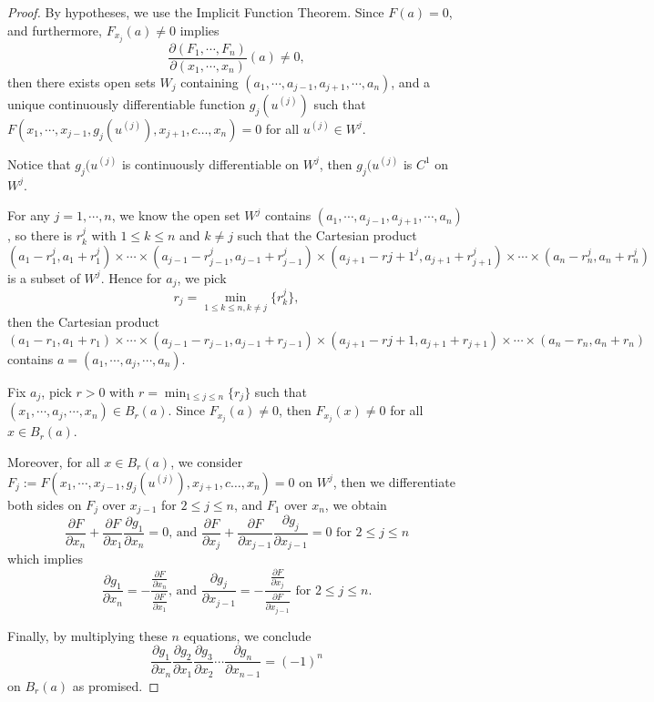 \begin{Exercise}
\begin{proof}
By hypotheses, we use the Implicit Function Theorem. Since $F(a) = 0$, and furthermore, $F_{x_j}(a) \neq 0$ implies
$$
\frac{\partial(F_1,\cdots,F_n)}{\partial(x_1,\cdots,x_n)}(a) \neq 0,
$$
then there exists open sets $W_j$ containing $(a_1,\cdots,a_{j-1},a_{j+1},\cdots,a_n)$, and a unique continuously differentiable function $g_j(u^{(j)})$ such that $F(x_1,\cdots,x_{j-1},g_j(u^{(j)}),x_{j+1},c\dots,x_n)=0$ for all $u^{(j)}\in W^j$.

Notice that $g_j(u^{(j)}$ is continuously differentiable on $W^j$, then $g_j(u^{(j)}$ is $C^1$ on $W^j$.

For any $j=1,\cdots, n$, we know the open set $W^j$ contains $(a_1,\cdots,a_{j-1},a_{j+1},\cdots,a_n)$, so there is $r_k^j$ with $1\leq k\leq n$ and $k\neq j$ such that the Cartesian product
$$
(a_1-r_1^j,a_1+r_1^j)\times\cdots\times(a_{j-1}-r_{j-1}^j,a_{j-1}+r_{j-1}^j)\times(a_{j+1}-r{j+1}^j,a_{j+1}+r_{j+1}^j)\times\cdots\times(a_n-r_n^j,a_n+r_n^j)
$$
is a subset of $W^j$. Hence for $a_j$, we pick
$$
r_j = \min_{1\leq k\leq n, k\neq j}\{r_k^j\},
$$
then the Cartesian product
$$
(a_1-r_1,a_1+r_1)\times\cdots\times(a_{j-1}-r_{j-1},a_{j-1}+r_{j-1})\times(a_{j+1}-r{j+1},a_{j+1}+r_{j+1})\times\cdots\times(a_n-r_n,a_n+r_n)
$$
contains $a=(a_1,\cdots,a_j,\cdots,a_n)$.

Fix $a_j$, pick $r>0$ with $r=\min_{1\leq j \leq n}\{r_j\}$ such that $(x_1,\cdots,a_j,\cdots,x_n)\in B_r(a)$. Since $F_{x_j}(a) \neq 0$, then $F_{x_j}(x) \neq 0$ for all $x\in B_r(a)$. 

Moreover, for all $x\in B_r(a)$, we consider
$F_j := F(x_1,\cdots,x_{j-1},g_j(u^{(j)}),x_{j+1},c\dots,x_n)=0$ on $W^j$, then we differentiate both sides on $F_j$ over $x_{j-1}$ for $2\leq j \leq n$, and $F_1$ over $x_n$, we obtain
$$
\frac{\partial F}{\partial x_n} + \frac{\partial F}{\partial x_1}\frac{\partial g_1}{\partial x_n} = 0\text{, and }
\frac{\partial F}{\partial x_j} + \frac{\partial F}{\partial x_{j-1}}\frac{\partial g_j}{\partial x_{j-1}} = 0 \mbox{ for } 2\leq j \leq n
$$
which implies
$$
\frac{\partial g_1}{\partial x_n} = -\frac{\frac{\partial F}{\partial x_n}}{\frac{\partial F}{\partial x_1}}\text{, and }
\frac{\partial g_j}{\partial x_{j-1}} = -\frac{\frac{\partial F}{\partial x_j}}{\frac{\partial F}{\partial x_{j-1}}} \mbox{ for } 2\leq j \leq n.
$$

Finally, by multiplying these $n$ equations, we conclude
$$
\frac{\partial g_1}{\partial x_n}\frac{\partial g_2}{\partial x_1}\frac{\partial g_3}{\partial x_2}\cdots\frac{\partial g_n}{\partial x_{n-1}} = (-1)^n
$$
on $B_r(a)$ as promised.
\end{proof}
\end{Exercise}